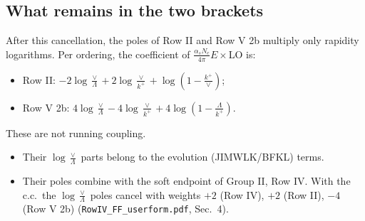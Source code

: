 \documentclass[10pt]{article}
\numberwithin{equation}{section}
\begin{document}
\subsection{What remains in the two brackets}
After this cancellation, the poles of Row II and Row V 2b multiply only rapidity logarithms. Per ordering, the coefficient of $\frac{\alpha_sN_c}{4\pi}E\times$LO is:
\begin{itemize}
\item Row II: $-2\log\frac{\vee}{\Lambda}+2\log\frac{\vee}{k^+}+\log(1-\frac{k^+}{\vee})$;
\item Row V 2b: $4\log\frac{\vee}{\Lambda}-4\log\frac{\vee}{k^+}+4\log(1-\frac{\Lambda}{k^+})$.
\end{itemize}
These are not running coupling.
\begin{itemize}
\item Their $\log\frac{\vee}{\Lambda}$ parts belong to the evolution (JIMWLK/BFKL) terms.
\item Their poles combine with the soft endpoint of Group II, Row IV. With the c.c.\ the $\log\frac{\vee}{\Lambda}$ poles cancel with weights $+2$ (Row IV), $+2$ (Row II), $-4$ (Row V 2b) (\texttt{RowIV\_FF\_userform.pdf}, Sec.~4).
\end{itemize}
\end{document}
